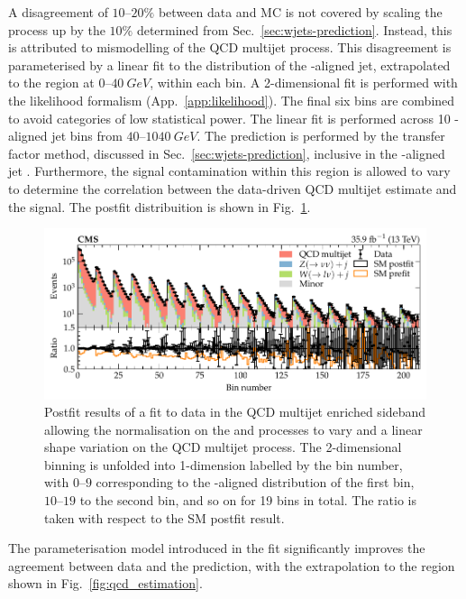 A disagreement of $10$--$20\%$ between data and MC is not covered by scaling the \IWlvj process up by the $10\%$ determined from Sec.~\ref{sec:wjets-prediction}. Instead, this is attributed to mismodelling of the QCD multijet process. This disagreement is parameterised by a linear fit to the \pt distribution of the \ptmiss-aligned jet, extrapolated to the \metplusjets region at {$0$--$\SI{40}{GeV}$}, within each \recoil bin. A 2-dimensional fit is performed with the likelihood formalism (App.~\ref{app:likelihood}). The final six \recoil bins are combined to avoid categories of low statistical power. The linear fit is performed across 10 \ptmiss-aligned jet \pt bins from {$40$--$\SI{1040}{GeV}$}. The \IWj prediction is performed by the transfer factor method, discussed in Sec.~\ref{sec:wjets-prediction}, inclusive in the \ptmiss-aligned jet \pt.  Furthermore, the \IZvvj signal contamination within this region is allowed to vary to determine the correlation between the data-driven QCD multijet estimate and the \IZvvj signal. The postfit distribuition is shown in Fig.~\ref{fig:qcd_postfit}.
%
\begin{figure}
    \centering
    \includegraphics{chapters/042_backgrounds/images/qcd_postfit.pdf}
    \caption[QCD multijet estimation within the enriched sideband]{
        Postfit results of a fit to data in the QCD multijet enriched sideband allowing the normalisation on the \IZvvj and \IWlvj processes to vary and a linear shape variation on the QCD multijet process. The 2-dimensional binning is unfolded into 1-dimension labelled by the bin number, with $0$--$9$ corresponding to the \ptmiss-aligned distribution of the first \recoil bin, $10$--$19$ to the second \recoil bin, and so on for 19 \recoil bins in total. The ratio is taken with respect to the SM postfit result.
    }
    \label{fig:qcd_postfit}
\end{figure}
%
The parameterisation model introduced in the fit significantly improves the agreement between data and the prediction, with the extrapolation to the \metplusjets region shown in Fig.~\ref{fig:qcd_estimation}.
